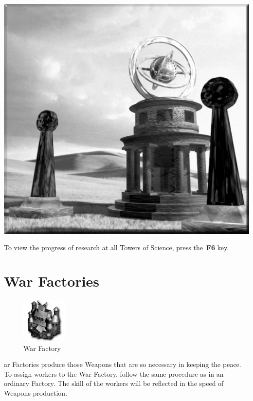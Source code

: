\begin{center}
	\includegraphics[width=0.9\linewidth]{Atower}
\end{center}

To view the progress of research at all Towers of Science, press the \textbf{F6} key.

\section{War Factories}

\begin{figure}
	\vspace{-20pt}
	\begin{center}
		\includegraphics[width=0.2\textwidth]{Iwarfactory}
		\\ War Factory
	\end{center}
	\vspace{-20pt}
\end{figure}

ar Factories produce those Weapons that are so necessary in keeping the peace. To assign workers to the War Factory, follow the same procedure as in an ordinary Factory. The skill of the workers will be reflected in the speed of Weapons production. \\ \\

